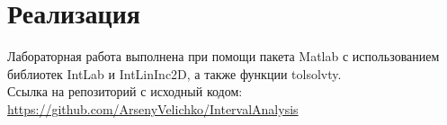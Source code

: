 \section{Реализация}
Лабораторная работа выполнена при помощи пакета Matlab с использованием библиотек IntLab и IntLinInc2D, а также функции tolsolvty.\\
Ссылка на репозиторий с исходный кодом:\\
\url{https://github.com/ArsenyVelichko/IntervalAnalysis}